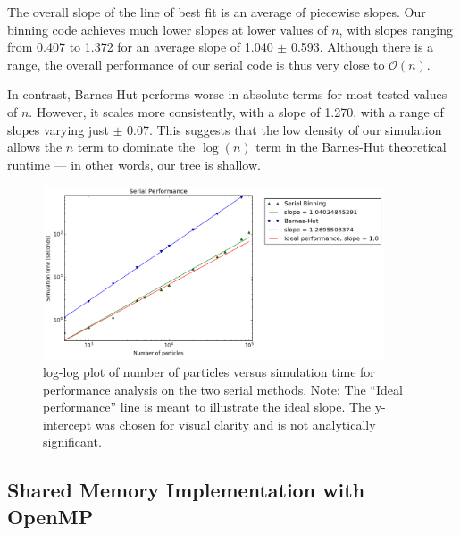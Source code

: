 \documentclass{article}
\begin{document}
The overall slope of the line of best fit is an
average of piecewise slopes. Our binning code achieves much lower slopes at
lower values of $n$, with slopes ranging from 0.407 to 1.372 for an average
slope of 1.040 $\pm$ 0.593. Although there is a range, the
overall performance of our serial code is thus very close to $\mathcal{O}(n)$.

In contrast, Barnes-Hut performs worse in absolute terms for most
tested values of $n$. However, it scales more consistently, with a slope of
1.270, with a range of slopes varying just $\pm$ 0.07. This suggests that the
low density of our simulation allows the $n$ term to dominate the $\log(n)$ term
in the Barnes-Hut theoretical runtime --- in other words, our tree is shallow.

%
\begin{figure}[ht!]
\centering
\includegraphics[width=0.9\textwidth]{serial.png}
\caption[Serial complexity plot]{log-log plot of number of particles versus
  simulation time for performance analysis on the two serial methods. Note: The
  ``Ideal performance'' line is meant to illustrate the ideal slope. The
  y-intercept was chosen for visual clarity and is not analytically
  significant.}\label{fig:serial}
\end{figure}
%

\subsection{Shared Memory Implementation with OpenMP}
\label{subsection:openmp}
\end{document}
